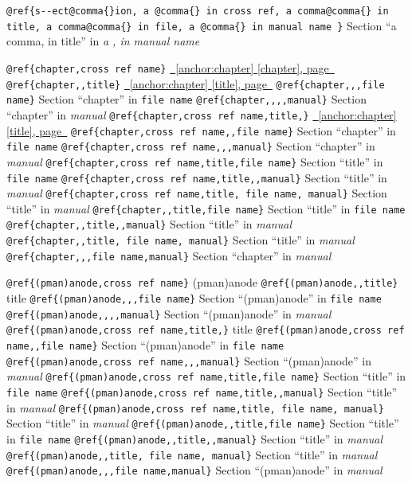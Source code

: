\documentclass{book}
\begin{document}
\texttt{@ref\{s{-}{-}ect@comma\{\}ion, a @comma\{\} in cross
ref, a comma@comma\{\} in title, a comma@comma\{\} in file, a @comma\{\} in manual name \}}
Section ``a comma, in title'' in \textit{a , in manual name}

\texttt{@ref\{chapter,cross ref name\}} \hyperref[anchor:chapter]{\chaptername~\ref*{anchor:chapter} [chapter], page~\pageref*{anchor:chapter}}
\texttt{@ref\{chapter,,title\}} \hyperref[anchor:chapter]{\chaptername~\ref*{anchor:chapter} [title], page~\pageref*{anchor:chapter}}
\texttt{@ref\{chapter,,,file name\}} Section ``chapter'' in \texttt{file name}
\texttt{@ref\{chapter,,,,manual\}} Section ``chapter'' in \textit{manual}
\texttt{@ref\{chapter,cross ref name,title,\}} \hyperref[anchor:chapter]{\chaptername~\ref*{anchor:chapter} [title], page~\pageref*{anchor:chapter}}
\texttt{@ref\{chapter,cross ref name,,file name\}} Section ``chapter'' in \texttt{file name}
\texttt{@ref\{chapter,cross ref name,,,manual\}} Section ``chapter'' in \textit{manual}
\texttt{@ref\{chapter,cross ref name,title,file name\}} Section ``title'' in \texttt{file name}
\texttt{@ref\{chapter,cross ref name,title,,manual\}} Section ``title'' in \textit{manual}
\texttt{@ref\{chapter,cross ref name,title, file name, manual\}} Section ``title'' in \textit{manual}
\texttt{@ref\{chapter,,title,file name\}} Section ``title'' in \texttt{file name}
\texttt{@ref\{chapter,,title,,manual\}} Section ``title'' in \textit{manual}
\texttt{@ref\{chapter,,title, file name, manual\}} Section ``title'' in \textit{manual}
\texttt{@ref\{chapter,,,file name,manual\}} Section ``chapter'' in \textit{manual}


\texttt{@ref\{(pman)anode,cross ref name\}} (pman)anode
\texttt{@ref\{(pman)anode,,title\}} title
\texttt{@ref\{(pman)anode,,,file name\}} Section ``(pman)anode'' in \texttt{file name}
\texttt{@ref\{(pman)anode,,,,manual\}} Section ``(pman)anode'' in \textit{manual}
\texttt{@ref\{(pman)anode,cross ref name,title,\}} title
\texttt{@ref\{(pman)anode,cross ref name,,file name\}} Section ``(pman)anode'' in \texttt{file name}
\texttt{@ref\{(pman)anode,cross ref name,,,manual\}} Section ``(pman)anode'' in \textit{manual}
\texttt{@ref\{(pman)anode,cross ref name,title,file name\}} Section ``title'' in \texttt{file name}
\texttt{@ref\{(pman)anode,cross ref name,title,,manual\}} Section ``title'' in \textit{manual}
\texttt{@ref\{(pman)anode,cross ref name,title, file name, manual\}} Section ``title'' in \textit{manual}
\texttt{@ref\{(pman)anode,,title,file name\}} Section ``title'' in \texttt{file name}
\texttt{@ref\{(pman)anode,,title,,manual\}} Section ``title'' in \textit{manual}
\texttt{@ref\{(pman)anode,,title, file name, manual\}} Section ``title'' in \textit{manual}
\texttt{@ref\{(pman)anode,,,file name,manual\}} Section ``(pman)anode'' in \textit{manual}
\end{document}
